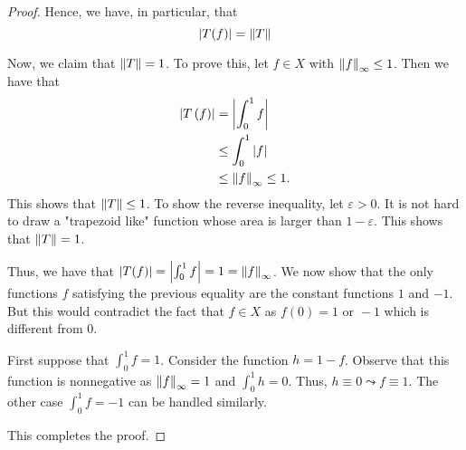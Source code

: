 \begin{proof}
    Hence, we have, in particular, that 
    \begin{equation*}
	\left\lvert T(f) \right\rvert=\left\lVert T \right\rVert
    \end{equation*}
    
    Now, we claim that $\left\lVert T \right\rVert=1$. To prove this, let $f\in X$ with $\left\lVert f \right\rVert_{\infty}\le1$. Then we have that
    \begin{align*}
	\left\lvert T\left( f \right) \right\rvert &=  \left\lvert \int_{0}^{1} f \right\rvert \\
	&\le \int_{0}^{1} \left\lvert f \right\rvert \\
	& \le \left\lVert f \right\rVert_{\infty} \le 1\text{.}
    \end{align*}
    This shows that $\left\lVert T \right\rVert \le 1$. To show the reverse inequality, let $\varepsilon > 0$. It is not hard to draw a "trapezoid like" function whose area is larger than $1-\varepsilon$. This shows that $\left\lVert T \right\rVert=1$.

    Thus, we have that $\left\lvert T(f) \right\rvert=\left\lvert \int_{0}^{1} f \right\rvert = 1 = \left\lVert f \right\rVert_{\infty}$. We now show that the only functions $f$ satisfying the previous equality are the constant functions $1$ and $-1$. But this would contradict the fact that $f\in X$ as $f(0) =1 \text{ or } -1$ which is different from $0$.

    First suppose that $\int_{0}^{1} f =1$. Consider the function $h=1-f$. Observe that this function is nonnegative as $\left\lVert f \right\rVert_{\infty}=1$ and $\int_{0}^{1} h = 0$. Thus, $h\equiv 0 \leadsto f\equiv1$. The other case $\int_{0}^{1}f  = -1$ can be handled similarly.

    This completes the proof.
\end{proof}
